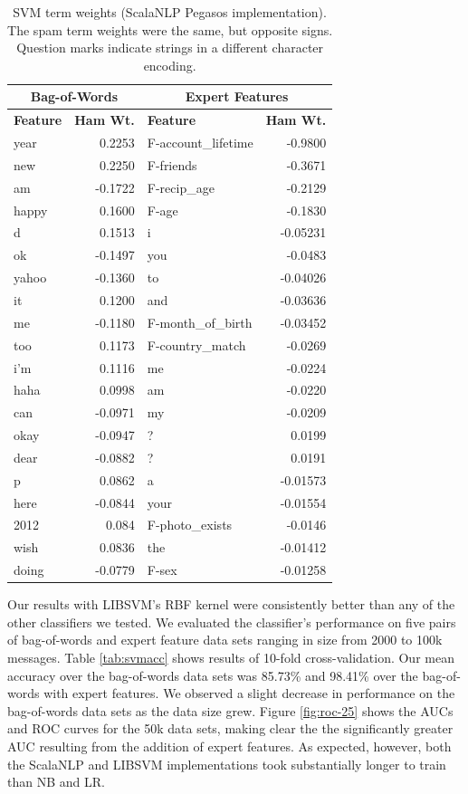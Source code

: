 \documentclass[preprint]{acm_proc_article-sp}
\begin{document}
\begin{table}
\begin{tabular}{l|r||l|r}
\multicolumn{2}{c}{\textbf{Bag-of-Words}} & 
\multicolumn{2}{c}{\textbf{Expert Features}} \\
\hline
\textbf{Feature} & \textbf{Ham Wt.} & \textbf{Feature} & \textbf{Ham Wt.} \\
\hline

year & 0.2253 & F-account\_lifetime & -0.9800\\
new & 0.2250 & F-friends & -0.3671\\
am & -0.1722 & F-recip\_age & -0.2129\\
happy & 0.1600 & F-age & -0.1830\\
d & 0.1513 & i & -0.05231\\
ok & -0.1497 & you & -0.0483\\
yahoo & -0.1360 & to & -0.04026\\
it & 0.1200 & and & -0.03636\\
me & -0.1180 & F-month\_of\_birth & -0.03452\\
too & 0.1173 & F-country\_match & -0.0269\\
i'm & 0.1116 & me & -0.0224\\
haha & 0.0998 & am & -0.0220\\
can & -0.0971 & my & -0.0209\\
okay & -0.0947 & ? & 0.0199\\
dear & -0.0882 & ? & 0.0191\\
p & 0.0862 & a & -0.01573\\
here & -0.0844 & your & -0.01554\\
2012 & 0.084 & F-photo\_exists & -0.0146\\
wish & 0.0836 & the & -0.01412\\
doing & -0.0779 & F-sex & -0.01258\\

\end{tabular}
\caption{SVM term weights (ScalaNLP Pegasos implementation). The spam term weights were the same, but opposite signs.
Question marks indicate strings in a different character encoding.}
\label{tab:svmfeats}
\end{table}

Our results with LIBSVM's RBF kernel were consistently better than any of the other classifiers we tested. We 
evaluated the classifier's performance on five pairs of bag-of-words and expert feature data sets ranging in 
size from 2000 to 100k messages. Table \ref{tab:svmacc} shows results of 10-fold cross-validation. Our mean 
accuracy over the bag-of-words data sets was 85.73\% and 98.41\% over the bag-of-words with expert features. We 
observed a slight decrease in performance on the bag-of-words data sets as the data size grew. Figure \ref{fig:roc-25}
shows the AUCs and ROC curves for the 50k data sets, making clear the the significantly greater AUC resulting 
from the addition of expert features. As expected, however, both the ScalaNLP and LIBSVM implementations 
took substantially longer to train than NB and LR.
\end{document}
